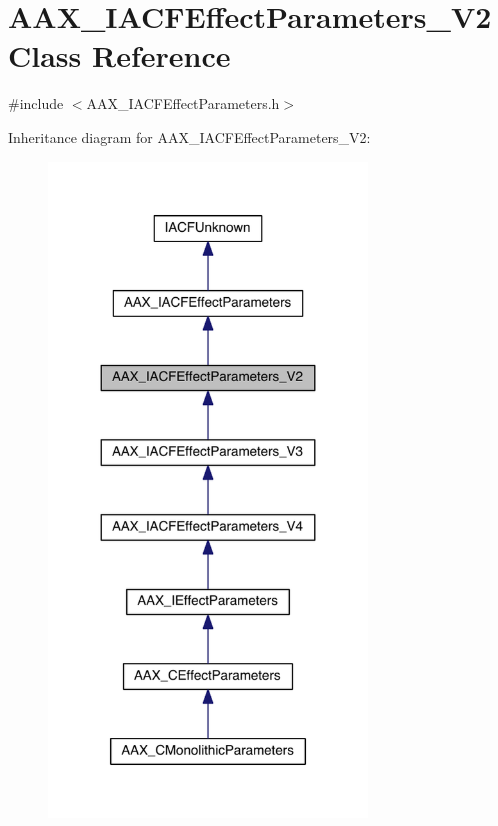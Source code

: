 \hypertarget{a00062}{}\section{A\+A\+X\+\_\+\+I\+A\+C\+F\+Effect\+Parameters\+\_\+\+V2 Class Reference}
\label{a00062}


{\ttfamily \#include $<$A\+A\+X\+\_\+\+I\+A\+C\+F\+Effect\+Parameters.\+h$>$}



Inheritance diagram for A\+A\+X\+\_\+\+I\+A\+C\+F\+Effect\+Parameters\+\_\+\+V2\+:
\nopagebreak
\begin{figure}[H]
\begin{center}
\leavevmode
\includegraphics[width=240pt]{a00529}
\end{center}
\end{figure}


